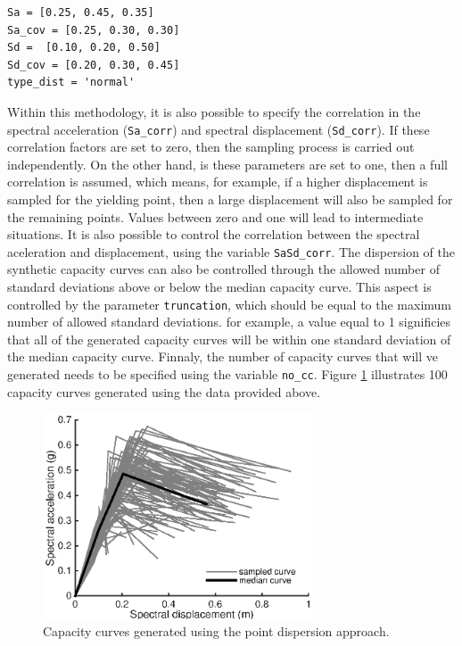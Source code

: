 \begin{Verbatim}[frame=single, commandchars=\\\{\}, samepage=true]
Sa = [0.25, 0.45, 0.35]
Sa_cov = [0.25, 0.30, 0.30]
Sd =  [0.10, 0.20, 0.50]
Sd_cov = [0.20, 0.30, 0.45]
type_dist = 'normal'
\end{Verbatim}

Within this methodology, it is also possible to specify the correlation in the spectral acceleration (\verb=Sa_corr=) and spectral displacement (\verb=Sd_corr=). If these correlation factors are set to zero, then the sampling process is carried out independently. On the other hand, is these parameters are set to one, then a full correlation is assumed, which means, for example, if a higher displacement is sampled for the yielding point, then a large displacement will also be sampled for the remaining points. Values between zero and one will lead to intermediate situations. It is also possible to control the correlation between the spectral aceleration and displacement, using the variable \verb=SaSd_corr=.
The dispersion of the synthetic capacity curves can also be controlled through the allowed number of standard deviations above or below the median capacity curve. This aspect is controlled by the parameter \verb=truncation=, which should be equal to the maximum number of allowed standard deviations. for example, a value equal to 1 significies that all of the generated capacity curves will be within one standard deviation of the median capacity curve. Finnaly, the number of capacity curves that will ve generated needs to be specified using the variable \verb=no_cc=. Figure \ref{fig:dispersion_cc} illustrates 100 capacity curves generated using the data provided above.

\begin{figure}[htb]
  \centering
      \includegraphics[width=8cm]{Figures/dispersion_cc.eps}
  \caption{Capacity curves generated using the point dispersion approach.}
  \label{fig:dispersion_cc}
\end{figure}

